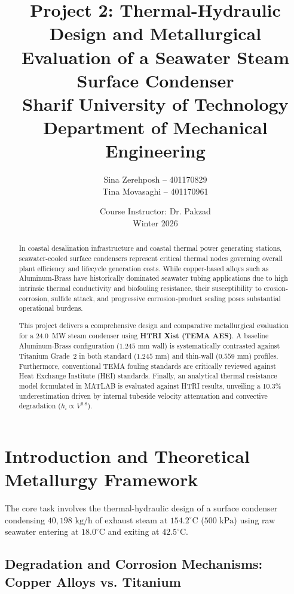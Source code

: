 \documentclass[12pt,a4paper]{article}
\title{\textbf{Project 2: Thermal-Hydraulic Design and Metallurgical Evaluation of a Seawater Steam Surface Condenser} \\[0.5em] \large Sharif University of Technology \\ Department of Mechanical Engineering}
\author{Sina Zerehposh -- 401170829 \\ Tina Movasaghi -- 401170961}
\date{Course Instructor: Dr. Pakzad \\ Winter 2026}
\begin{document}
\maketitle

\begin{abstract}
In coastal desalination infrastructure and coastal thermal power generating stations, seawater-cooled surface condensers represent critical thermal nodes governing overall plant efficiency and lifecycle generation costs. While copper-based alloys such as Aluminum-Brass have historically dominated seawater tubing applications due to high intrinsic thermal conductivity and biofouling resistance, their susceptibility to erosion-corrosion, sulfide attack, and progressive corrosion-product scaling poses substantial operational burdens. 

This project delivers a comprehensive design and comparative metallurgical evaluation for a 24.0~MW steam condenser using \textbf{HTRI Xist (TEMA AES)}. A baseline Aluminum-Brass configuration ($1.245\text{ mm}$ wall) is systematically contrasted against Titanium Grade~2 in both standard ($1.245\text{ mm}$) and thin-wall ($0.559\text{ mm}$) profiles. Furthermore, conventional TEMA fouling standards are critically reviewed against Heat Exchange Institute (HEI) standards. Finally, an analytical thermal resistance model formulated in MATLAB is evaluated against HTRI results, unveiling a 10.3\% underestimation driven by internal tubeside velocity attenuation and convective degradation ($h_i \propto V^{0.8}$).
\end{abstract}

\newpage
\tableofcontents
\newpage

\section{Introduction and Theoretical Metallurgy Framework}

The core task involves the thermal-hydraulic design of a surface condenser condensing $40{,}198\text{ kg/h}$ of exhaust steam at $154.2^\circ\text{C}$ ($500\text{ kPa}$) using raw seawater entering at $18.0^\circ\text{C}$ and exiting at $42.5^\circ\text{C}$.

\subsection{Degradation and Corrosion Mechanisms: Copper Alloys vs. Titanium}
\end{document}
